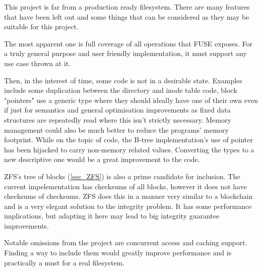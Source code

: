         This project is far from a production ready filesystem. There are many
        features that have been left out and some things that can be considered
        as they may be suitable for this project.

        The most apparent one is full coverage of all operations that FUSE
        exposes. For a truly general purpose and user friendly implementation,
        it must support any use case thrown at it.

        Then, in the interest of time, some code is not in a desirable state.
        Examples include some duplication between the directory and inode table
        code, block "pointers" use a generic type where they should ideally
        have one of their own even if just for semantics and general
        optimisation improvements as fixed data structures are repeatedly read
        where this isn't strictly necessary. Memory management could also be
        much better to reduce the programs' memory footprint. While on the
        topic of code, the B-tree implementation's use of pointer has been
        hijacked to carry non-memory related values. Converting the types to a
        new descriptive one would be a great improvement to the code.

        ZFS's tree of blocks (\ref{sec_ZFS}) is also a prime candidate for
        inclusion. The current impelementation has checksums of all blocks,
        however it does not have checksums of checksums. ZFS does this in a
        manner very similar to a blockchain and is a very elegant solution to
        the integrity problem. It has some performance implications, but
        adapting it here may lead to big integrity guarantee improvements.

        Notable omissions from the project are concurrent access and caching
        support. Finding a way to include them would greatly improve
        performance and is practically a must for a real filesystem.
